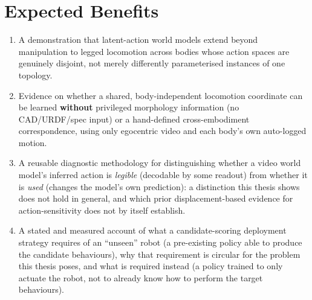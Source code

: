 \documentclass[12pt,a4paper,oneside]{report}
\begin{document}
\section{Expected Benefits}
\begin{enumerate}[label=\arabic*.]
\item A demonstration that latent-action world models extend beyond manipulation to legged locomotion across
  bodies whose action spaces are genuinely disjoint, not merely differently parameterised instances of one
  topology.
\item Evidence on whether a shared, body-independent locomotion coordinate can be learned \textbf{without}
  privileged morphology information (no CAD/URDF/spec input) or a hand-defined cross-embodiment correspondence,
  using only egocentric video and each body's own auto-logged motion.
\item A reusable diagnostic methodology for distinguishing whether a video world model's inferred action is
  \emph{legible} (decodable by some readout) from whether it is \emph{used} (changes the model's own
  prediction): a distinction this thesis shows does not hold in general, and which prior displacement-based
  evidence for action-sensitivity does not by itself establish.
\item A stated and measured account of what a candidate-scoring deployment strategy requires of an ``unseen''
  robot (a pre-existing policy able to produce the candidate behaviours), why that requirement is circular for
  the problem this thesis poses, and what is required instead (a policy trained to only actuate the robot, not
  to already know how to perform the target behaviours).
\end{enumerate}
\end{document}

